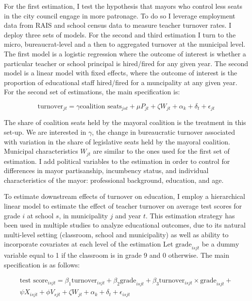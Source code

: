 For the first estimation, I test the hypothesis that mayors who control less seats in the city council engage in more patronage. To do so I leverage employment data from RAIS and school census data to measure teacher turnover rates. I deploy three sets of models. For the second and third estimation I turn to the micro, bureaucrat-level and a then to aggregated turnover at the municipal level. The first model is a logistic regression where the outcome of interest is whether a particular teacher or school principal is hired/fired for any given year. The second model is a linear model with fixed effects, where the outcome of interest is the proportion of educational staff hired/fired for a muncipality at any given year. For the second set of estimations, the main specification is:

$$\text{turnover}_{jt} = \gamma \text{coalition seats}_{jst} + \mu P_{jt} + \zeta W_{jt}+ \alpha_k + \delta_t + \epsilon_{jt}$$

The share of coalition seats held by the mayoral coalition is the treatment in this set-up. We are interested in $\gamma$, the change in bureaucratic turnover associated with variation in the share of legislative seats held by the mayoral coalition. Municipal characteristics $W_{jt}$ are similar to the ones used for the first set of estimation. I add political variables to the estimation in order to control for differences in mayor partisanship, incumbency status, and individual characteristics of the mayor: professional background, education, and age.

To estimate downstream effects of turnover on education, I employ a hierarchical linear model to estimate the effect of teacher turnover on average test scores for grade $i$ at school $s$, in municipality $j$ and year $t$. This estimation strategy has been used in multiple studies to analyze educational outcomes, due to its natural multi-level setting (classroom, school and municipality) as well as ability to incorporate covariates at each level of the estimation \citep{diprete_multilevel_1994, lee_using_2000} Let $\text{grade}_{isjt}$ be a dummy variable equal to 1 if the classroom is in grade 9 and 0 otherwise. The main specification is as follows:

\begin{align*}
\text{test score}_{isjt} = \beta_1 \text{turnover}_{isjt} + \beta_2 \text{grade}_{isjt} +\beta_3 \text{turnover}_{isjt} \times \text{grade}_{isjt} + \\ 
\psi X_{isjt} + \phi V_{sjt} +\zeta W_{jt}+ \alpha_k + \delta_t + \epsilon_{isjt}
\end{align*}

